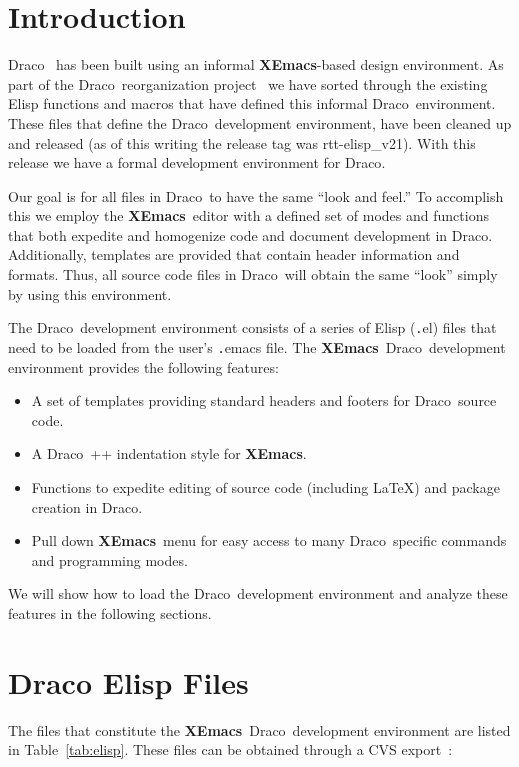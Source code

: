 \documentclass[11pt]{nmemo}
\newcommand{\comp}[1]{{\normalfont\texttt#1}}
\newcommand{\draco}{{\normalfont\sffamily Draco}}
\newcommand{\xemacs}{{\normalfont\bfseries XEmacs}}
\begin{document}
\section{Introduction}

\draco~\cite{rn98046} has been built using an informal \xemacs-based
design environment.  As part of the \draco\ reorganization
project~\cite{draco-build} we have sorted through the existing Elisp
functions and macros that have defined this informal \draco\ 
environment.  These files that define the \draco\ development
environment, have been cleaned up and released (as of this writing the
release tag was rtt-elisp\_v21).  With this release we have a formal
development environment for \draco.

Our goal is for all files in \draco\ to have the same ``look and
feel.''  To accomplish this we employ the \xemacs\ editor with a
defined set of modes and functions that both expedite and homogenize
code and document development in \draco.  Additionally, templates are
provided that contain header information and formats.  Thus, all
source code files in \draco\ will obtain the same ``look'' simply by
using this environment.

The \draco\ development environment consists of a series of Elisp
(\comp{.el}) files that need to be loaded from the user's
\comp{.emacs} file.  The \xemacs\ \draco\ development environment
provides the following features:
\begin{itemize}
\item A set of templates providing standard headers and footers for
  \draco\ source code.
\item A \draco\ \C++ indentation style for \xemacs.
\item Functions to expedite editing of source code (including \LaTeX)
  and package creation in \draco.
\item Pull down \xemacs\ menu for easy access to many \draco\ specific
  commands and programming modes.
\end{itemize}
We will show how to load the \draco\ development environment and
analyze these features in the following sections.


\section{Draco Elisp Files}

The files that constitute the \xemacs\ \draco\ development environment
are listed in Table~\ref{tab:elisp}.  These files can be obtained
through a CVS export~\cite{cvs}: 
\end{document}
